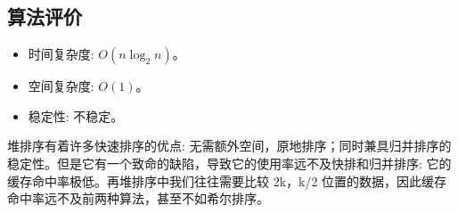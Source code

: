 \subsection{算法评价}

\begin{itemize}
  \item 时间复杂度: $O(n\log_2 n)$。
  \item 空间复杂度: $O(1)$。
  \item 稳定性: 不稳定。
\end{itemize}

堆排序有着许多快速排序的优点: 无需额外空间，原地排序；同时兼具归并排序的稳定性。但是它有一个致命的缺陷，导致它的使用率远不及快排和归并排序: 它的缓存命中率极低。再堆排序中我们往往需要比较 2k，k/2 位置的数据，因此缓存命中率远不及前两种算法，甚至不如希尔排序。

\newpage